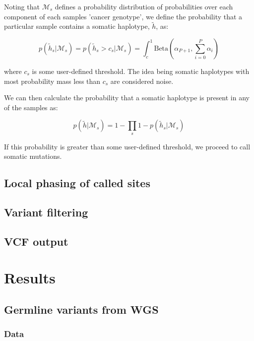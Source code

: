 \documentclass{article}
\begin{document}
Noting that $\mathcal{M}_s$ defines a probability distribution of probabilities over each component of each samples 'cancer genotype', we define the probability that a particular sample contains a somatic haplotype, $\tilde{h}$, as:

\begin{equation}
\label{eq:somatic_probability_sample}
p(\tilde{h}_s | \mathcal{M}_s) = p(\tilde{h}_s > c_s | \mathcal{M}_s) = \int_c^1 \text{Beta}(\alpha_{P + 1}, \sum_{i = 0}^{P} \alpha_i)
\end{equation}

\noindent where $c_s$ is some user-defined threshold. The idea being somatic haplotypes with most probability mass less than $c_s$ are considered noise.

We can then calculate the probability that a somatic haplotype is present in any of the samples as:

\begin{equation}
\label{eq:somatic_probability}
p(\tilde{h} | \mathcal{M}_s) = 1 - \prod_s 1 - p(\tilde{h}_s | \mathcal{M}_s)
\end{equation}

\noindent If this probability is greater than some user-defined threshold, we proceed to call somatic mutations.

\subsection{Local phasing of called sites}

\subsection{Variant filtering}

\subsection{VCF output}

\section{Results}

\subsection{Germline variants from WGS}

\subsubsection{Data}
\end{document}
